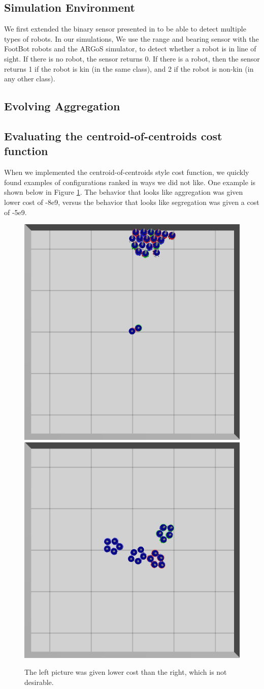 \documentclass[conference]{IEEEtran}
\begin{document}
  \subsection{Simulation Environment}

  We first extended the binary sensor presented in \cite{gauci_self-organized_2014} to be able to detect multiple types of robots. In our simulations, We use the range and bearing sensor with the FootBot robots and the ARGoS simulator, to detect whether a robot is in line of sight. If there is no robot, the sensor returns 0. If there is a robot, then the sensor returns 1 if the robot is kin (in the same class), and 2 if the robot is non-kin (in any other class).

  \subsection{Evolving Aggregation}

  \subsection{Evaluating the centroid-of-centroids cost function}

  When we implemented the centroid-of-centroids style cost function, we quickly found examples of configurations ranked in ways we did not like. One example is shown below in Figure \ref{fig:cost_function_fuckup}. The behavior that looks like aggregation was given lower cost of -8e9, versus the behavior that looks like segregation was given a cost of -5e9.

  \begin{figure}
    \centering
    \includegraphics[width=0.49\linewidth]{./images/individual_0_gen_0.png}
    \includegraphics[width=0.49\linewidth]{./images/individual_0_gen_1_better.png}
    \caption{The left picture was given lower cost than the right, which is not desirable.}
    \label{fig:cost_function_fuckup}
  \end{figure}
\end{document}

